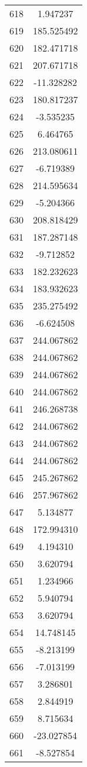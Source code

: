 \documentclass[12pt]{article}
\begin{document}
\begin{longtable}{@{}cc@{}}
618 & 1.947237 \\
619 & 185.525492 \\
620 & 182.471718 \\
621 & 207.671718 \\
622 & -11.328282 \\
623 & 180.817237 \\
624 & -3.535235 \\
625 & 6.464765 \\
626 & 213.080611 \\
627 & -6.719389 \\
628 & 214.595634 \\
629 & -5.204366 \\
630 & 208.818429 \\
631 & 187.287148 \\
632 & -9.712852 \\
633 & 182.232623 \\
634 & 183.932623 \\
635 & 235.275492 \\
636 & -6.624508 \\
637 & 244.067862 \\
638 & 244.067862 \\
639 & 244.067862 \\
640 & 244.067862 \\
641 & 246.268738 \\
642 & 244.067862 \\
643 & 244.067862 \\
644 & 244.067862 \\
645 & 245.267862 \\
646 & 257.967862 \\
647 & 5.134877 \\
648 & 172.994310 \\
649 & 4.194310 \\
650 & 3.620794 \\
651 & 1.234966 \\
652 & 5.940794 \\
653 & 3.620794 \\
654 & 14.748145 \\
655 & -8.213199 \\
656 & -7.013199 \\
657 & 3.286801 \\
658 & 2.844919 \\
659 & 8.715634 \\
660 & -23.027854 \\
661 & -8.527854 \\

\end{longtable}
\end{document}
